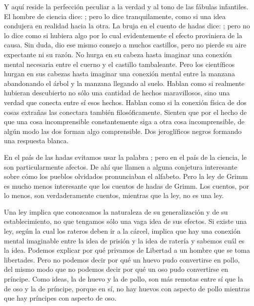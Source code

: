 Y aquí reside la perfección peculiar a la verdad y al tono de las fábulas infantiles. El hombre de
ciencia dice: ; pero lo dice tranquilamente, como si una idea condujera
en realidad hacia la otra. La bruja en el cuento de hadas dice: ; pero no lo dice como si hubiera algo por lo cual evidentemente el efecto proviniera de la causa. Sin
duda, dio ese mismo consejo a muchos castillos, pero no pierde su aire expectante ni su razón. No hurga
en su cabeza hasta imaginar una conexión mental necesaria entre el cuerno y el castillo tambaleante. Pero
los científicos hurgan en sus cabezas hasta imaginar una conexión mental entre la manzana abandonando
el árbol y la manzana llegando al suelo. Hablan como si realmente hubieran descubierto no sólo una
cantidad de hechos maravillosos, sino una verdad que conecta entre sí esos hechos. Hablan como si la
conexión física de dos cosas extrañas las conectara también filosóficamente. Sienten que por el hecho de
que una cosa incomprensible constantemente siga a otra cosa incomprensible, de algún modo las dos
forman algo comprensible. Dos jeroglíficos negros formando una respuesta blanca.

En el país de las hadas evitamos usar la palabra ; pero en el país de la ciencia, le son
particularmente afectos. De ahí que llamen  a alguna conjetura interesante sobre cómo
los pueblos olvidados pronunciaban el alfabeto. Pero la ley de Grimm es mucho menos interesante que los
cuentos de hadas de Grimm. Los cuentos, por lo menos, son verdaderamente cuentos, mientras que la ley,
no es una ley.

Una ley implica que conozcamos la naturaleza de su generalización y de su establecimiento, no que
tengamos sólo una vaga idea de sus efectos. Si existe una ley, según la cual los rateros deben ir a la
cárcel, implica que hay una conexión mental imaginable entre la idea de prisión y la idea de ratería y
sabemos cuál es la idea. Podemos explicar por qué privamos de Libertad a un hombre que se toma
libertades. Pero no podemos decir por qué un huevo pudo convertirse en pollo, del mismo modo que no
podemos decir por qué un oso pudo convertirse en príncipe. Como ideas, la de huevo y la de pollo, son
más remotas entre sí que la de oso y la de príncipe, porque en sí, no hay huevos con aspecto de pollo
mientras que hay príncipes con aspecto de oso.

